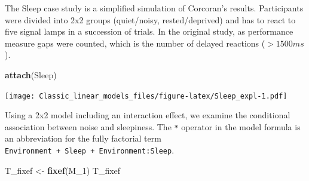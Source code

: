\documentclass[]{svmono}
\newenvironment{Shaded}{\begin{snugshade}}{\end{snugshade}}
\newcommand{\KeywordTok}[1]{\textcolor[rgb]{0.13,0.29,0.53}{\textbf{#1}}}
\newcommand{\DataTypeTok}[1]{\textcolor[rgb]{0.13,0.29,0.53}{#1}}
\newcommand{\DecValTok}[1]{\textcolor[rgb]{0.00,0.00,0.81}{#1}}
\newcommand{\StringTok}[1]{\textcolor[rgb]{0.31,0.60,0.02}{#1}}
\newcommand{\OperatorTok}[1]{\textcolor[rgb]{0.81,0.36,0.00}{\textbf{#1}}}
\newcommand{\NormalTok}[1]{#1}
\theoremstyle{definition}
\theoremstyle{definition}
\theoremstyle{definition}
\theoremstyle{remark}
\begin{document}
The Sleep case study is a simplified simulation of Corcoran's results.
Participants were divided into 2x2 groups (quiet/noisy, rested/deprived)
and has to react to five signal lamps in a succession of trials. In the
original study, as performance measure gaps were counted, which is the
number of delayed reactions (\(>1500ms\)).

\begin{Shaded}
\begin{Highlighting}[]
\KeywordTok{attach}\NormalTok{(Sleep)}
\end{Highlighting}
\end{Shaded}

\begin{Shaded}
\end{Shaded}

\texttt{[image: Classic\_linear\_models\_files/figure-latex/Sleep\_expl-1.pdf]}

Using a 2x2 model including an interaction effect, we examine the
conditional association between noise and sleepiness. The \texttt{*}
operator in the model formula is an abbreviation for the fully factorial
term \texttt{Environment\ +\ Sleep\ +\ Environment:Sleep}.

\begin{Shaded}
\end{Shaded}

\begin{Shaded}
\begin{Highlighting}[]
\NormalTok{T_fixef <-}\StringTok{  }\KeywordTok{fixef}\NormalTok{(M_}\DecValTok{1}\NormalTok{)}
\NormalTok{T_fixef}
\end{Highlighting}
\end{Shaded}
\end{document}
